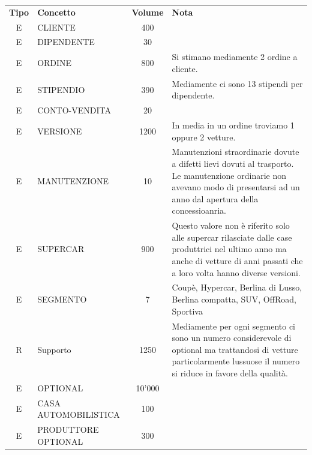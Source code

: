 \documentclass[11pt]{article}
\begin{document}
\begin{table}[htbp]
    \centering
    \small
    \begin{tabularx}{\textwidth}{c l c X }
        \rowcolor{red!20!}
        \textbf{Tipo} & \textbf{Concetto} & \textbf{Volume} & \textbf{Nota}\\
        E & CLIENTE & 400 & \\
        E & DIPENDENTE & 30 & \\
        E & ORDINE & 800 & Si stimano mediamente 2 ordine a cliente. \\
        E & STIPENDIO & 390 & Mediamente ci sono 13 stipendi per dipendente. \\
        E & CONTO-VENDITA & 20 & \\
        E & VERSIONE & 1200 & In media in un ordine troviamo 1 oppure 2 vetture.
        \\
        E & MANUTENZIONE & 10 & Manutenzioni straordinarie dovute a difetti
                                lievi dovuti al trasporto. Le manutenzione
                                ordinarie non avevano modo di presentarsi ad un
                                anno dal apertura della concessioanria. \\
        E & SUPERCAR & 900 & Questo valore non è riferito solo alle supercar
                                rilasciate dalle case produttrici nel ultimo
                                anno ma anche di vetture di anni passati che a
                                loro volta hanno diverse versioni. \\
        
        E & SEGMENTO & 7 & Coupè, Hypercar, Berlina di Lusso, Berlina compatta,
        SUV, OffRoad, Sportiva \\
        R & Supporto & 1250 & Mediamente per ogni segmento ci sono un numero
                                considerevole di optional ma trattandosi di
                                vetture particolarmente lussuose il numero si
                                riduce in favore della qualità. \\
        E & OPTIONAL & 10'000 & \\
        E & CASA AUTOMOBILISTICA & 100 & \\
        E & PRODUTTORE OPTIONAL & 300 & \\  
        
    \end{tabularx}
    \label{tab:volume_table}
\end{table}
\end{document}
